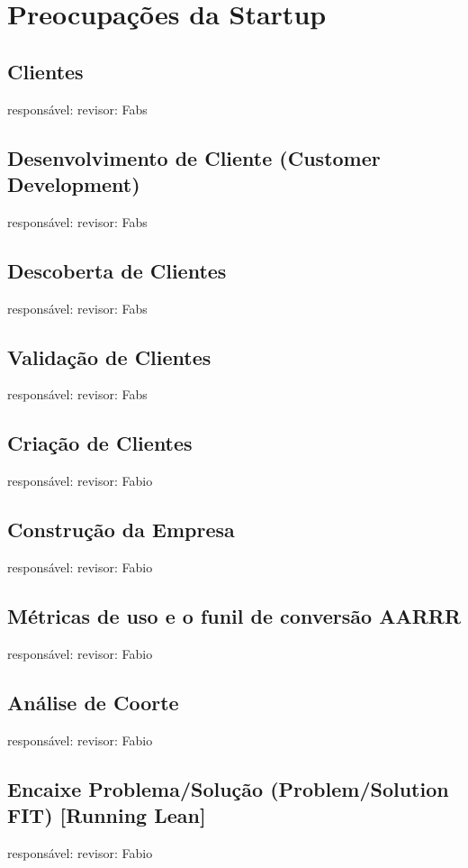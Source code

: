 \section{Preocupações da Startup}

\subsection{Clientes}
responsável: revisor: Fabs

\subsection{Desenvolvimento de Cliente (Customer Development)}
responsável: revisor: Fabs


\subsection{Descoberta de Clientes}
responsável: revisor: Fabs

\subsection{Validação de Clientes}
responsável: revisor: Fabs

\subsection{Criação de Clientes}
responsável: revisor: Fabio

\subsection{Construção da Empresa}
responsável: revisor: Fabio

\subsection{Métricas de uso e o funil de conversão AARRR}
responsável: revisor: Fabio

\subsection{Análise de Coorte}
responsável: revisor: Fabio

\subsection{Encaixe Problema/Solução (Problem/Solution FIT) [Running Lean]}
responsável: revisor: Fabio
